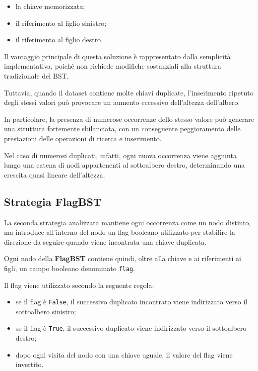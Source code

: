 \documentclass[a4paper,12pt]{article}
\begin{document}
\begin{itemize}

    \item la chiave memorizzata;

    \item il riferimento al figlio sinistro;

    \item il riferimento al figlio destro.

\end{itemize}

Il vantaggio principale di questa soluzione è rappresentato dalla semplicità implementativa, poiché non richiede modifiche sostanziali alla struttura tradizionale del BST.

Tuttavia, quando il dataset contiene molte chiavi duplicate, l'inserimento ripetuto degli stessi valori può provocare un aumento eccessivo dell'altezza dell'albero.

In particolare, la presenza di numerose occorrenze dello stesso valore può generare una struttura fortemente sbilanciata, con un conseguente peggioramento delle prestazioni delle operazioni di ricerca e inserimento.

Nel caso di numerosi duplicati, infatti, ogni nuova occorrenza viene aggiunta lungo una catena di nodi appartenenti al sottoalbero destro, determinando una crescita quasi lineare dell'altezza.

\subsection{Strategia FlagBST}

La seconda strategia analizzata mantiene ogni occorrenza come un nodo distinto, ma introduce all'interno del nodo un flag booleano utilizzato per stabilire la direzione da seguire quando viene incontrata una chiave duplicata.

Ogni nodo della \textbf{FlagBST} contiene quindi, oltre alla chiave e ai riferimenti ai figli, un campo booleano denominato \texttt{flag}.

Il flag viene utilizzato secondo la seguente regola:

\begin{itemize}

    \item se il flag è \texttt{False}, il successivo duplicato incontrato viene indirizzato verso il sottoalbero sinistro;

    \item se il flag è \texttt{True}, il successivo duplicato viene indirizzato verso il sottoalbero destro;

    \item dopo ogni visita del nodo con una chiave uguale, il valore del flag viene invertito.

\end{itemize}
\end{document}
